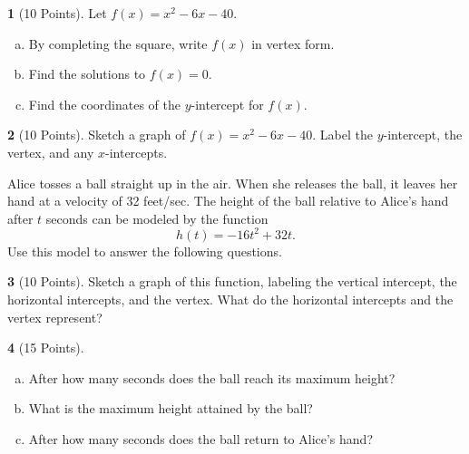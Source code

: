 \documentclass[12pt]{amsart}
\theoremstyle{definition}
\newtheorem{thm}{}
\begin{document}
\newpage

\begin{thm}[10 Points]
  Let $f(x) = x^2 - 6x - 40$.
  \begin{enumerate}[(a)]
  \item
    By completing the square, write $f(x)$ in vertex form.
    \vspace{2in}
  \item
    Find the solutions to $f(x) = 0$.
    \vspace{2in}
  \item
    Find the coordinates of the $y$-intercept for $f(x)$.
    \vspace{1in}
  \end{enumerate}
\end{thm}

\newpage

\begin{thm}[10 Points]
  Sketch a graph of $f(x) = x^2 - 6x - 40.$
  Label the $y$-intercept, the vertex, and any $x$-intercepts.
\end{thm}


\newpage
\noindent Alice tosses a ball straight up in the air.
When she releases the ball, it leaves her hand at a velocity of 32 feet/sec.
The height of the ball relative to Alice's hand after $t$ seconds can be modeled by the function
$$h(t) = -16t^2 + 32t.$$
Use this model to answer the following questions.
\begin{thm}[10 Points]
Sketch a graph of this function, labeling the vertical intercept, the horizontal intercepts, and the vertex.
What do the horizontal intercepts and the vertex represent?
\end{thm}

\newpage

\begin{thm}[15 Points]
    \begin{enumerate}[(a)]
  \item
    After how many seconds does the ball reach its maximum height?
    \vspace{2in}
  \item
    What is the maximum height attained by the ball?
    \vspace{2in}
  \item
    After how many seconds does the ball return to Alice's hand?
  \end{enumerate}
\end{thm}
\end{document}
